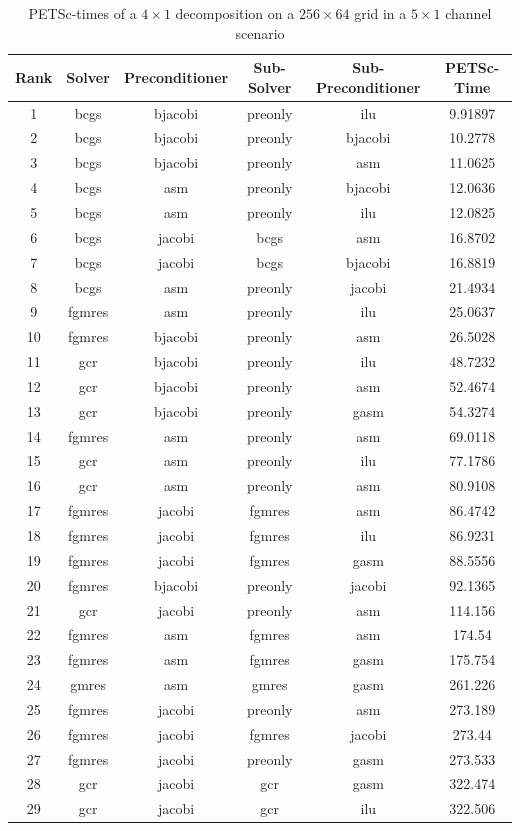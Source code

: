 \begin{table}[h]
  \tiny
  \centering
  \begin{tabular}{cccccc}
    \hline Rank & Solver & Preconditioner & Sub-Solver & Sub-Preconditioner & PETSc-Time\\ \hline

    1 & bcgs & bjacobi & preonly & ilu & 9.91897 \\
    2 & bcgs & bjacobi & preonly & bjacobi & 10.2778 \\
    3 & bcgs & bjacobi & preonly & asm & 11.0625 \\
    4 & bcgs & asm & preonly & bjacobi & 12.0636 \\
    5 & bcgs & asm & preonly & ilu & 12.0825 \\
    6 & bcgs & jacobi & bcgs & asm & 16.8702 \\
    7 & bcgs & jacobi & bcgs & bjacobi & 16.8819 \\
    8 & bcgs & asm & preonly & jacobi & 21.4934 \\
    9 & fgmres & asm & preonly & ilu & 25.0637 \\
    10 & fgmres & bjacobi & preonly & asm & 26.5028 \\
    11 & gcr & bjacobi & preonly & ilu & 48.7232 \\
    12 & gcr & bjacobi & preonly & asm & 52.4674 \\
    13 & gcr & bjacobi & preonly & gasm & 54.3274 \\
    14 & fgmres & asm & preonly & asm & 69.0118 \\
    15 & gcr & asm & preonly & ilu & 77.1786 \\
    16 & gcr & asm & preonly & asm & 80.9108 \\
    17 & fgmres & jacobi & fgmres & asm & 86.4742 \\
    18 & fgmres & jacobi & fgmres & ilu & 86.9231 \\
    19 & fgmres & jacobi & fgmres & gasm & 88.5556 \\
    20 & fgmres & bjacobi & preonly & jacobi & 92.1365 \\
    21 & gcr & jacobi & preonly & asm & 114.156 \\
    22 & fgmres & asm & fgmres & asm & 174.54 \\
    23 & fgmres & asm & fgmres & gasm & 175.754 \\
    24 & gmres & asm & gmres & gasm & 261.226 \\
    25 & fgmres & jacobi & preonly & asm & 273.189 \\
    26 & fgmres & jacobi & fgmres & jacobi & 273.44 \\
    27 & fgmres & jacobi & preonly & gasm & 273.533 \\
    28 & gcr & jacobi & gcr & gasm & 322.474 \\
    29 & gcr & jacobi & gcr & ilu & 322.506 \\
    \hline
  \end{tabular}
  \caption{PETSc-times of a $4 \times 1$ decomposition on a $256 \times 64$ grid in a $5 \times 1$ channel scenario}
  \label{fig:petsc-opt-combinations-4x1}
\end{table}

